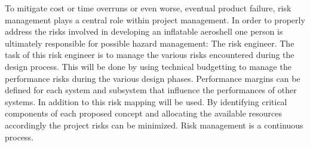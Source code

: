 To mitigate cost or time overruns or even worse, eventual product failure, risk management plays a central role within project management. In order to properly address the risks involved in developing an inflatable aeroshell one person is ultimately responsible for possible hazard management: The risk engineer. The task of this risk engineer is to manage the various risks encountered during the design process. This will be done by using technical budgetting to manage the performance risks during the various design phases. Performance margins can be defined for each system and subsystem that influence the performances of other systems. In addition to this risk mapping will be used. By identifying critical components of each proposed concept and allocating the available resources accordingly the project risks can be minimized. Risk management is a continuous process.